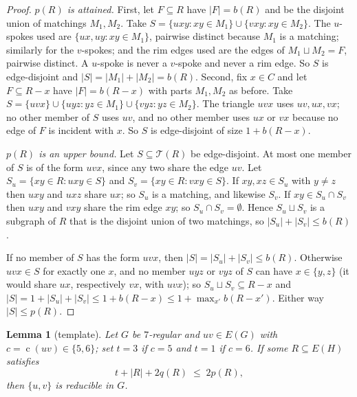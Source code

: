 \documentclass[11pt,a4paper]{amsart}
\theoremstyle{plain}
\newtheorem{lemma}[theorem]{Lemma}
\theoremstyle{definition}
\newcommand{\cod}{\operatorname{c}}
\begin{document}
\begin{proof}
\emph{$p(R)$ is attained.} First, let $F\subseteq R$ have $|F|=b(R)$ and be
the disjoint union of matchings $M_1,M_2$. Take
$S=\{uxy : xy\in M_1\}\cup\{vxy : xy\in M_2\}$. The $u$-spokes used are
$\{ux,uy : xy\in M_1\}$, pairwise distinct because $M_1$ is a matching;
similarly for the $v$-spokes; and the rim edges used are the edges of
$M_1\sqcup M_2=F$, pairwise distinct. A $u$-spoke is never a $v$-spoke and
never a rim edge. So $S$ is edge-disjoint and $|S|=|M_1|+|M_2|=b(R)$.
Second, fix $x\in C$ and let $F\subseteq R-x$ have $|F|=b(R-x)$ with parts
$M_1,M_2$ as before. Take $S=\{uvx\}\cup\{uyz:yz\in M_1\}\cup\{vyz:yz\in
M_2\}$. The triangle $uvx$ uses $uv,ux,vx$; no other member of $S$ uses $uv$,
and no other member uses $ux$ or $vx$ because no edge of $F$ is incident with
$x$. So $S$ is edge-disjoint of size $1+b(R-x)$.

\emph{$p(R)$ is an upper bound.} Let $S\subseteq\mathcal{T}(R)$ be
edge-disjoint. At most one member of $S$ is of the form $uvx$, since any two
share the edge $uv$. Let $S_u=\{xy\in R : uxy\in S\}$ and
$S_v=\{xy\in R : vxy\in S\}$. If $xy,xz\in S_u$ with $y\ne z$ then $uxy$ and
$uxz$ share $ux$; so $S_u$ is a matching, and likewise $S_v$. If
$xy\in S_u\cap S_v$ then $uxy$ and $vxy$ share the rim edge $xy$; so
$S_u\cap S_v=\emptyset$. Hence $S_u\sqcup S_v$ is a subgraph of $R$ that is
the disjoint union of two matchings, so $|S_u|+|S_v|\le b(R)$.

If no member of $S$ has the form $uvx$, then $|S|=|S_u|+|S_v|\le b(R)$.
Otherwise $uvx\in S$ for exactly one $x$, and no member $uyz$ or $vyz$ of $S$
can have $x\in\{y,z\}$ (it would share $ux$, respectively $vx$, with $uvx$);
so $S_u\sqcup S_v\subseteq R-x$ and
$|S|=1+|S_u|+|S_v|\le 1+b(R-x)\le 1+\max_{x'}b(R-x')$. Either way
$|S|\le p(R)$.
\end{proof}

\begin{lemma}[template]\label{lem:template}
Let $G$ be $7$-regular and $uv\in E(G)$ with $c=\cod(uv)\in\{5,6\}$; set
$t=3$ if $c=5$ and $t=1$ if $c=6$. If some $R\subseteq E(H)$ satisfies
\begin{equation}\label{eq:template}
  t+|R|+2q(R)\;\le\;2p(R),
\end{equation}
then $\{u,v\}$ is reducible in $G$.
\end{lemma}
\end{document}
